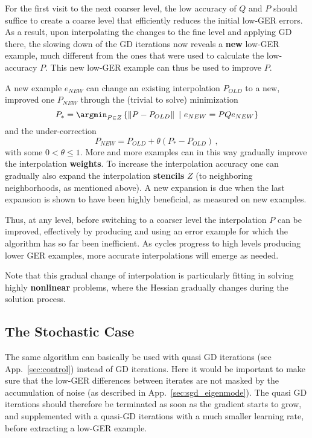 \documentclass{article} %
\begin{document}
For the first visit to the next coarser level, the low accuracy of $Q$ and $P$ should suffice to create a coarse level that efficiently reduces the initial low-GER errors. As a result, upon interpolating the changes to the fine level and applying GD there, the slowing down of the GD iterations now reveals a \textbf{new} low-GER example, much different from the ones that were used to calculate the low-accuracy $P$. This new low-GER example can thus be used to improve $P$.

A new example $e_{NEW}$ can change an existing interpolation $P_{OLD}$ to a new, improved one $P_{NEW}$ through the (trivial to solve) minimization
\begin{equation}
  P_* = \argmin_{P \in Z} \left\{ \left\| P - P_{OLD} \right\| \,\, | \,\, e_{NEW} = P Q e_{NEW} \right\}
\label{p_star}
\end{equation}
and the under-correction
$$
  P_{NEW} = P_{OLD} + \theta \left( P_* - P_{OLD} \right)\,,
$$
  with some $0 < \theta \leq 1$. More and more examples can in this way gradually improve the interpolation \textbf{weights}. To increase the interpolation accuracy one can gradually also expand the interpolation \textbf{stencils} $Z$ (to neighboring neighborhoods, as mentioned above). A new expansion is due when the last expansion is shown to have been highly beneficial, as measured on new examples.

Thus, at any level, before switching to a coarser level the interpolation $P$ can be improved, effectively by producing and using an error example for which the algorithm has so far been inefficient. As cycles progress to high levels producing lower GER examples, more accurate interpolations will emerge as needed.

Note that this gradual change of interpolation is particularly fitting in solving highly \textbf{nonlinear} problems, where the Hessian gradually changes during the solution process.

\subsection{The Stochastic Case}
The same algorithm can basically be used with quasi GD iterations (see App.~\ref{sec:control}) instead of GD iterations. Here it would be important to make sure that the low-GER differences between iterates are not masked by the accumulation of noise (as described in App.~\ref{sec:sgd_eigenmode}). The quasi GD iterations should therefore be terminated as soon as the gradient starts to grow, and supplemented with a quasi-GD iterations with a much smaller learning rate, before extracting a low-GER example.
\end{document}
